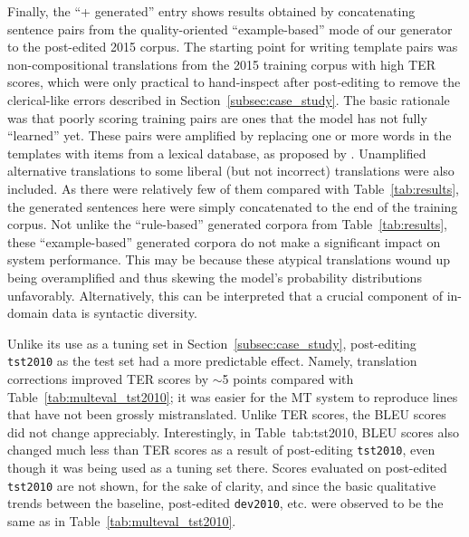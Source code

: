 {Finally, the ``+ generated'' entry %
shows results obtained by concatenating sentence pairs from the quality-oriented ``example-based'' mode of our generator to the post-edited 2015 corpus.
The starting point for writing template pairs was non-compositional translations from the 2015 training corpus with high TER scores, which were only practical to hand-inspect after post-editing to remove the clerical-like errors described in Section~\ref{subsec:case_study}.
The basic rationale was that poorly scoring training pairs are ones that the model has not fully ``learned'' yet.
These pairs were amplified by replacing one or more words in the templates with items from a lexical database, as proposed by .
Unamplified alternative translations to some liberal (but not incorrect) translations were also included.
As there were relatively few of them compared with Table~\ref{tab:results}, the generated sentences here were simply concatenated to the end of the training corpus.
Not unlike the ``rule-based'' generated corpora from Table~\ref{tab:results}, these ``example-based'' generated corpora do not make a significant impact on system performance. 
This may be because these atypical translations wound up being overamplified and thus skewing the model's probability distributions unfavorably.
Alternatively, this can be interpreted that a crucial component of in-domain data is syntactic diversity.

Unlike its use as a tuning set in Section~\ref{subsec:case_study}, post-editing {\small \tt tst2010} as the test set had a more predictable effect.
Namely, translation corrections improved TER scores by $\sim$5 points compared with Table~\ref{tab:multeval_tst2010}; it was easier for the MT system to reproduce lines that have not been grossly mistranslated.
Unlike TER scores, the BLEU scores did not change appreciably. %
Interestingly, in Table~{tab:tst2010}, BLEU scores also changed much less than TER scores as a result of post-editing {\small \tt tst2010}, even though it was being used as a tuning set there.
Scores evaluated on post-edited {\small \tt tst2010} are not shown, for the sake of clarity, and since the basic qualitative trends between the baseline, post-edited {\small \tt dev2010}, etc. were observed to be the same as in Table~\ref{tab:multeval_tst2010}.





}
